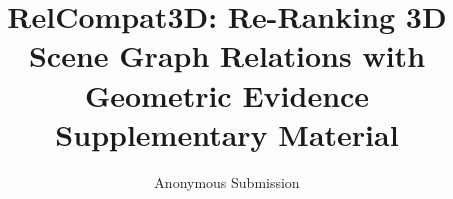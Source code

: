 \documentclass[letterpaper]{article}
\title{RelCompat3D: Re-Ranking 3D Scene Graph Relations with Geometric Evidence\\Supplementary Material}
\author{Anonymous Submission}
\begin{document}
\maketitle
\appendix
\setcounter{secnumdepth}{2}
\renewcommand{\thetable}{S\arabic{table}}
\renewcommand{\thefigure}{S\arabic{figure}}
\renewcommand{\theequation}{S\arabic{equation}}

\end{document}
